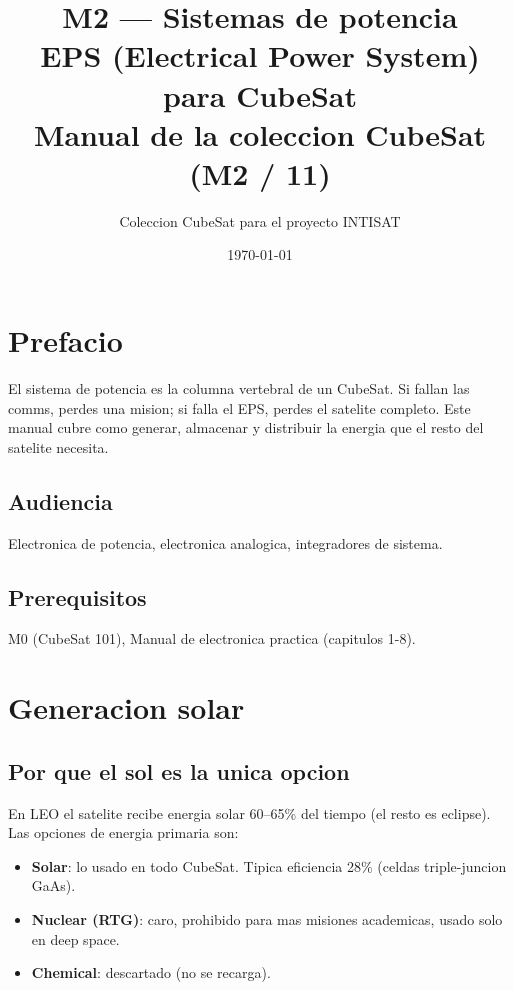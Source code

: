 \documentclass[11pt,a4paper,oneside,openright]{book}
\title{\Huge\bfseries M2 --- Sistemas de potencia\\[0.4em]
\Large EPS (Electrical Power System) para CubeSat\\[0.6em]
\large Manual de la coleccion CubeSat (M2 / 11)}
\author{Coleccion CubeSat para el proyecto INTISAT}
\date{\today}
\begin{document}
\frontmatter
\maketitle

\chapter*{Prefacio}

El sistema de potencia es la columna vertebral de un CubeSat. Si fallan
las comms, perdes una mision; si falla el EPS, perdes el satelite
completo. Este manual cubre como generar, almacenar y distribuir la
energia que el resto del satelite necesita.

\section*{Audiencia}
Electronica de potencia, electronica analogica, integradores de sistema.

\section*{Prerequisitos}
M0 (CubeSat 101), Manual de electronica practica (capitulos 1-8).

\tableofcontents

\mainmatter

\chapter{Generacion solar}

\section{Por que el sol es la unica opcion}

En LEO el satelite recibe energia solar 60--65\% del tiempo (el resto es
eclipse). Las opciones de energia primaria son:

\begin{itemize}[leftmargin=2em]
  \item \textbf{Solar}: lo usado en todo CubeSat. Tipica eficiencia 28\%
        (celdas triple-juncion GaAs).
  \item \textbf{Nuclear (RTG)}: caro, prohibido para mas misiones
        academicas, usado solo en deep space.
  \item \textbf{Chemical}: descartado (no se recarga).
\end{itemize}
\end{document}
